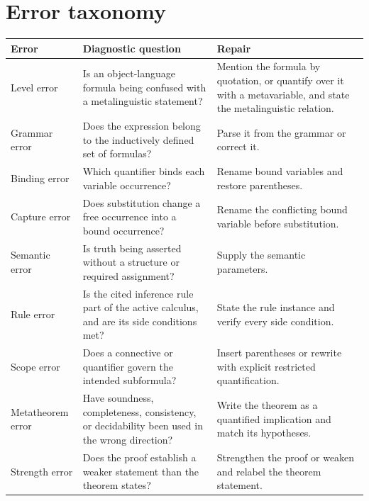\section{Error taxonomy}
\label{sec:writing-foundations-07}

\begin{longtable}{@{}p{}p{}p{}@{}}
\toprule
Error & Diagnostic question & Repair \\
\midrule
\endhead
Level error & Is an object-language formula being confused with a
metalinguistic statement? & Mention the formula by quotation, or quantify
over it with a metavariable, and state the metalinguistic relation. \\
\addlinespace
Grammar error & Does the expression belong to the inductively defined set of
formulas? & Parse it from the grammar or correct it. \\
\addlinespace
Binding error & Which quantifier binds each variable occurrence? & Rename bound
variables and restore parentheses. \\
\addlinespace
Capture error & Does substitution change a free occurrence into a bound
occurrence? & Rename the conflicting bound variable before substitution. \\
\addlinespace
Semantic error & Is truth being asserted without a structure or required
assignment? & Supply the semantic parameters. \\
\addlinespace
Rule error & Is the cited inference rule part of the active calculus, and are
its side conditions met? & State the rule instance and verify every side
condition. \\
\addlinespace
Scope error & Does a connective or quantifier govern the intended subformula? &
Insert parentheses or rewrite with explicit restricted quantification. \\
\addlinespace
Metatheorem error & Have soundness, completeness, consistency, or decidability
been used in the wrong direction? & Write the theorem as a quantified
implication and match its hypotheses. \\
\addlinespace
Strength error & Does the proof establish a weaker statement than the theorem
states? & Strengthen the proof or weaken and relabel the theorem statement. \\
\bottomrule
\end{longtable}

